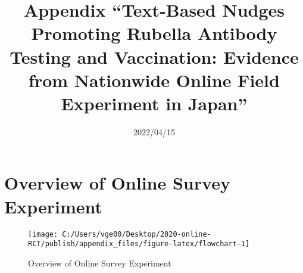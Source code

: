 \documentclass[
  11pt,
  a4paper,
]{article}
\title{Appendix
``Text-Based Nudges Promoting Rubella Antibody Testing and Vaccination:
Evidence from Nationwide Online Field Experiment in Japan''  }
\date{2022/04/15}
\begin{document}
\begin{spacing}{1}
  \maketitle
\end{spacing}

{
\setcounter{tocdepth}{2}
\tableofcontents
}
\hypertarget{appendix-appendix}{%
\appendix}


\hypertarget{overview-of-online-survey-experiment}{%
\section{Overview of Online Survey Experiment}\label{overview-of-online-survey-experiment}}

\begin{figure}[t]
\texttt{[image: C:/Users/vge00/Desktop/2020-online-RCT/publish/appendix\_files/figure-latex/flowchart-1]} \caption{Overview of Online Survey Experiment}\label{fig:flowchart}
\end{figure}
\end{document}
